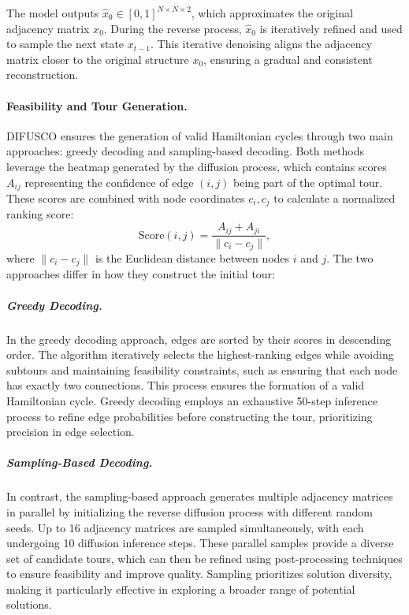 The model outputs \(\hat{x}_0 \in [0, 1]^{N \times N \times 2}\), which approximates the original adjacency matrix \(x_0\). During the reverse process, \(\hat{x}_0\) is iteratively refined and used to sample the next state \(x_{t-1}\). This iterative denoising aligns the adjacency matrix closer to the original structure \(x_0\), ensuring a gradual and consistent reconstruction.

\paragraph{Feasibility and Tour Generation.}  
DIFUSCO ensures the generation of valid Hamiltonian cycles through two main approaches: greedy decoding and sampling-based decoding. Both methods leverage the heatmap generated by the diffusion process, which contains scores \( A_{ij} \) representing the confidence of edge \((i, j)\) being part of the optimal tour. These scores are combined with node coordinates \( c_i, c_j \) to calculate a normalized ranking score:
\[
\text{Score}(i, j) = \frac{A_{ij} + A_{ji}}{\|c_i - c_j\|},
\]
where \(\|c_i - c_j\|\) is the Euclidean distance between nodes \(i\) and \(j\). The two approaches differ in how they construct the initial tour:

\subparagraph{Greedy Decoding.}  
In the greedy decoding approach, edges are sorted by their scores in descending order. The algorithm iteratively selects the highest-ranking edges while avoiding subtours and maintaining feasibility constraints, such as ensuring that each node has exactly two connections. This process ensures the formation of a valid Hamiltonian cycle. Greedy decoding employs an exhaustive 50-step inference process to refine edge probabilities before constructing the tour, prioritizing precision in edge selection.

\subparagraph{Sampling-Based Decoding.}  
In contrast, the sampling-based approach generates multiple adjacency matrices in parallel by initializing the reverse diffusion process with different random seeds. Up to 16 adjacency matrices are sampled simultaneously, with each undergoing 10 diffusion inference steps. These parallel samples provide a diverse set of candidate tours, which can then be refined using post-processing techniques to ensure feasibility and improve quality. Sampling prioritizes solution diversity, making it particularly effective in exploring a broader range of potential solutions.

